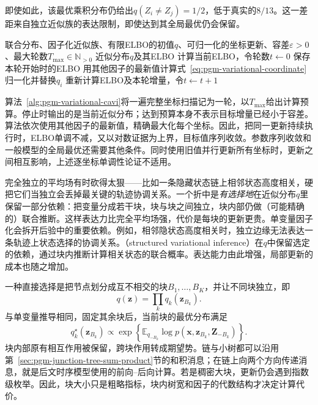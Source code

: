 即使如此，该最优乘积分布仍给出$q(Z_i\ne Z_j)=1/2$，低于真实的$8/13$。这一差距来自独立近似族的表达限制，即使达到其全局最优仍会保留。

\par\noindent\begin{minipage}{\linewidth}
\begin{algorithm}[循环坐标平均场]
  \label{alg:pgm-variational-cavi}
  \begin{algorithmic}[1]
    \Require 联合分布、因子化近似族、有限ELBO的初值$q$、可归一化的坐标更新、容差$\varepsilon>0$、最大轮数$T_{\max}\in\mathbb N_{>0}$
    \Ensure 近似分布$q$及其ELBO
    \State 计算当前ELBO，令轮数$t\gets0$
    \Repeat
      \State 保存本轮开始时的ELBO
        \State 用其他因子的最新值计算式~\eqref{eq:pgm-variational-coordinate}
        \State 归一化并替换$q_i$
      \EndFor
      \State 重新计算ELBO及本轮增量，令$t\gets t+1$
  \end{algorithmic}
\end{algorithm}
\end{minipage}\par

算法~\ref{alg:pgm-variational-cavi}将一遍完整坐标扫描记为一轮，以$T_{\max}$给出计算预算。停止时输出的是当前近似分布；达到预算本身不表示目标增量已经小于容差。算法依次使用其他因子的最新值，精确最大化每个坐标。因此，把同一更新持续执行时，ELBO单调不减，又以对数证据为上界，目标值序列收敛。参数序列收敛和一般模型的全局最优还需要其他条件。同时使用旧值并行更新所有坐标时，更新之间相互影响，上述逐坐标单调性论证不适用。

完全独立的平均场有时砍得太狠——比如一条隐藏状态链上相邻状态高度相关，硬把它们当独立会丢掉最关键的轨迹协调关系。一个折中是\emph{有选择地}在近似分布$q$里保留一部分依赖：把变量分成若干块，块与块之间独立，块内部仍做（可能精确的）联合推断。这样表达力比完全平均场强，代价是每块的更新更贵。单变量因子化会拆开后验中的重要依赖。例如，相邻隐状态高度相关时，独立边缘无法表达一条轨迹上状态选择的协调关系。（structured variational inference）在$q$中保留选定的依赖，通过块内推断计算相关状态的联合概率。表达能力由此增强，局部更新的成本也随之增加。
\label{sec:pgm-variational-structured}

一种直接选择是把节点划分成互不相交的块$B_1,\ldots,B_K$，并让不同块独立，即
\[
  q(\bm z)=\prod_k q_k(\bm z_{B_k}).
\]
与单变量推导相同，固定其余块后，当前块的最优分布满足
\begin{equation}
  q_k^\star(\bm z_{B_k})
     \propto\exp\left\{
       \mathbb E_{q_{-B_k}}\log p(\bm x,\bm z_{B_k},\bm Z_{-B_k})
     \right\}.
  \label{eq:pgm-variational-block}
\end{equation}
块内部原有相互作用被保留，跨块作用转成期望势。链与小树都可以沿用第~\ref{sec:pgm-junction-tree-sum-product}节的和积消息；在链上向两个方向传递消息，就是后文时序模型使用的前向--后向计算。若是稠密大块，更新仍会遇到指数级枚举。因此，块大小只是粗略指标，块内树宽和因子的代数结构才决定计算代价。

